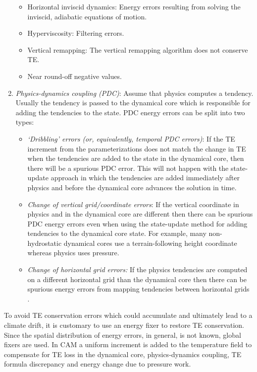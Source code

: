 \documentclass{agujournal}
\begin{document}
\begin{enumerate}
\begin{itemize}
\item Horizontal inviscid dynamics: Energy errors resulting from solving the inviscid, adiabatic equations of motion.
\item Hyperviscosity: Filtering errors.
\item Vertical remapping: The vertical remapping algorithm does not conserve TE.
\item Near round-off negative values.
\end{itemize}
\item {\em{Physics-dynamics coupling (PDC)}}: Assume that physics computes a tendency. Usually the tendency is passed to the dynamical core which is responsible for adding the tendencies to the state. PDC energy errors can be split into two types:
\begin{itemize}
\item {\em{`Dribbling' errors (or, equivalently, temporal PDC errors)}}: If the TE increment from the parameterizations does not match the change in TE when the tendencies are added to the state in the dynamical core, then there will be a spurious PDC error. This will not happen with the state-update approach in which the tendencies are added immediately after physics and before the dynamical core advances the solution in time.
\item {\em{Change of vertical grid/coordinate errors}}: If the vertical coordinate in physics and in the dynamical core are different then there can be spurious PDC energy errors even when using the state-update method for adding tendencies to the dynamical core state. For example, many non-hydrostatic dynamical cores \citep[e.g.][]{MPASatm} use a terrain-following height coordinate whereas physics uses pressure.
\item {\em{Change of horizontal grid errors:}} If the physics tendencies are computed on a different horizontal grid than the dynamical core then there can be spurious energy errors from mapping tendencies between horizontal grids \citep[e.g., ][]{HetAl2018MWR}. 
\end{itemize}
\end{enumerate}
To avoid TE conservation errors which could accumulate and ultimately lead to a climate drift, it is customary to use an energy fixer to restore TE conservation. Since the spatial distribution of energy errors, in general, is not known, global fixers are used. In CAM a uniform increment is added to the temperature field to compensate for TE loss in the dynamical core, physics-dynamics coupling, TE formula discrepancy and energy change due to pressure work. 
\end{document}
